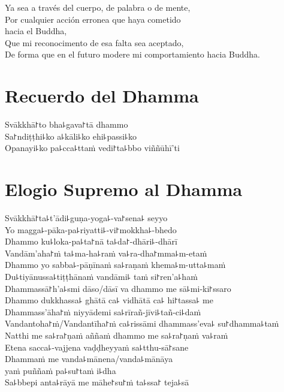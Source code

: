 Ya sea a través del cuerpo, de palabra o de mente,\\
Por cualquier acción erronea que haya cometido\\
\vin hacia el Buddha,\\
Que mi reconocimento de esa falta sea aceptado,\\
De forma que en el futuro modere mi comportamiento hacia Buddha.

\clearpage

\chapter*{Recuerdo del Dhamma}

\delegateSetUseNext

\begin{leader}
\end{leader}

Svākkhā꜓to bha꜕gava꜓tā dhammo\\
Sa꜓ndiṭṭhi꜕ko a꜕kāli꜕ko ehi꜕passi꜕ko\\
Opanayi꜕ko pa꜕cca꜕ttaṁ vedi꜓ta꜕bbo viññūhī'ti

\chapter*{Elogio Supremo al Dhamma}

\begin{leader}
\end{leader}

Svākkhā꜓ta꜕t'ādi꜕guṇa-yoga꜕-va꜓sena꜕ seyyo\\
Yo magga꜕-pāka-pa꜕riyatti꜕-vi꜓mokkha꜕-bhedo\\
Dhammo ku꜕loka-pa꜕ta꜓nā ta꜕da꜓-dhāri꜕-dhārī\\
Vandām'aha꜓ṁ ta꜕ma-ha꜕raṁ va꜕ra-dha꜓mma꜕m-etaṁ\\
Dhammo yo sabba꜕-pāṇīnaṁ sa꜕raṇaṁ khema꜕m-utta꜕maṁ\\
Du꜕tiyānussa꜕tiṭṭhānaṁ vandāmi꜕ taṁ si꜓ren'a꜕haṁ\\
Dhammassā꜓h'a꜕smi dāso/dāsī va dhammo me sā꜕mi-ki꜓ssaro\\
Dhammo dukkhassa꜕ ghātā ca꜕ vidhātā ca꜕ hi꜓tassa꜕ me\\
Dhammass'āha꜓ṁ niyyādemi sa꜕rīrañ-jīvi꜕tañ-ci꜕daṁ\\
Vandantoha꜓ṁ/Vandantīha꜓ṁ ca꜕rissāmi dhammass'eva꜕ su꜓dhamma꜕taṁ\\
Natthi me sa꜕ra꜓ṇaṁ aññaṁ dhammo me sa꜕ra꜓ṇaṁ va꜕raṁ\\
Etena sacca꜕-vajjena vaḍḍheyyaṁ sa꜕tthu-sā꜓sane\\
Dhammaṁ me vanda꜕mānena/vanda꜕mānāya\\
\vin yaṁ puññaṁ pa꜕su꜓taṁ i꜕dha\\
Sa꜕bbepi anta꜕rāyā me māhe꜓su꜓ṁ ta꜕ssa꜓ teja꜕sā


